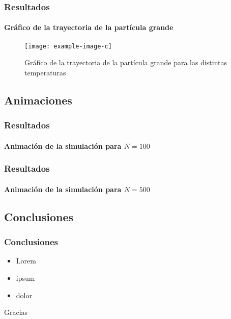 \documentclass[hyperref={pdfpagelayout=SinglePage}]{beamer}
\begin{document}
\begin{frame}
\frametitle{Resultados}
\framesubtitle{Gráfico de la trayectoria de la partícula grande}
\begin{figure}[H]
        \centering
        \texttt{[image: example-image-c]}
        \caption{Gráfico de la trayectoria de la partícula grande para las distintas temperaturas}
\end{figure}
\end{frame}

\subsection{Animaciones}

\begin{frame}
\frametitle{Resultados}
\framesubtitle{Animación de la simulación para $N = 100$}
\begin{figure}[H]
	\centering
\end{figure}
\end{frame}

\begin{frame}
\frametitle{Resultados}
\framesubtitle{Animación de la simulación para $N = 500$}
\begin{figure}[H]
	\centering
\end{figure}
\end{frame}

\subsection{Conclusiones}

\begin{frame}
\frametitle{Conclusiones}
\begin{itemize}
	\item Lorem
	\item ipsum
	\item dolor
\end{itemize}
\end{frame}

\begin{frame}[plain,c]
\begin{center}
	\Huge Gracias
\end{center}
\end{frame}
\end{document}
